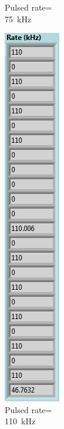\begin{figure}[H]
\begin{minipage}{0.24\textwidth}
		\caption{Pulsed rate=\\75~kHz}
		\label{fig:75khz}
	\end{minipage}
	\begin{minipage}{0.24\textwidth}
		\centering
		\includegraphics[width=.75\linewidth]{IMG/ch5/latch_tests/fig19}
		\caption{Pulsed rate=\\110~kHz}
		\label{fig:110khz}
	\end{minipage}
\end{figure}







